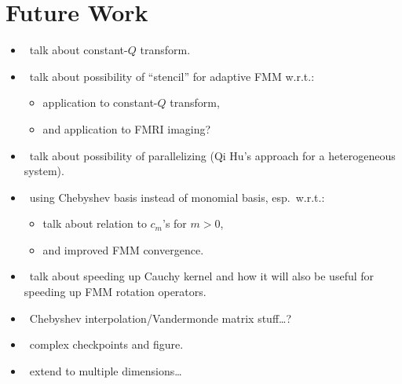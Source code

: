 \section{Future Work}

\begin{itemize}
\item \TODO\ talk about constant-$Q$ transform.
\item \TODO\ talk about possibility of ``stencil'' for adaptive FMM w.r.t.:
  \begin{itemize}
  \item application to constant-$Q$ transform,
  \item and application to FMRI imaging?
  \end{itemize}
\item \TODO\ talk about possibility of parallelizing (Qi Hu's approach
  for a heterogeneous system).
\item \TODO\ using Chebyshev basis instead of monomial basis, esp.\ w.r.t.:
  \begin{itemize}
  \item talk about relation to $c_m$'s for $m > 0$,
  \item and improved FMM convergence.
  \end{itemize}
\item \TODO\ talk about speeding up Cauchy kernel and how it will also
  be useful for speeding up FMM rotation operators.
\item \TODO\ Chebyshev interpolation/Vandermonde matrix stuff\ldots?
\item \TODO\ complex checkpoints and figure.
\item \TODO\ extend to multiple dimensions\ldots
\end{itemize}

